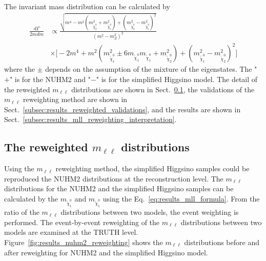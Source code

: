 The invariant mass distribution can be calculated by
%
\begin{align}
    \frac{d\Gamma}{2mdm}
    & \propto \frac{\sqrt{m^{4}-m^{2}(m^{2}_{\widetilde{\chi}^{0}_{2}} + m^{2}_{\widetilde{\chi}^{0}_{1}})+(m^{2}_{\widetilde{\chi}^{0}_{2}} - m^{2}_{\widetilde{\chi}^{0}_{1}})^{2}}}{(m^{2} - m^{2}_{Z})^{2}}\\
    & \times \Big[-2m^{4}+m^{2}(m^{2}_{\widetilde{\chi}^{0}_{1}} \pm 6 m_{\widetilde{\chi}^{0}_{1}} m_{\widetilde{\chi}^{0}_{1}} + m^{2}_{\widetilde{\chi}^{0}_{2}})+(m^{2}_{\widetilde{\chi}^{0}_{1}} - m^{2}_{\widetilde{\chi}^{0}_{2}})^{2}\Big]
    \label{eq:results_mll_formula}
\end{align}
%
where the $\pm$ depends on the assumption of the mixture of the eigenstates.
The "$+$" is for the NUHM2 and "$-$" is for the simplified Higgsino model.
The detail of the reweighted $m_{\ell \ell}$ distributions are shown in Sect.~\ref{subsec:results_reweighted_mll_distributions}, the validations of the $m_{\ell \ell}$ reweighting method are shown in Sect.~\ref{subsec:results_reweighted_validations}, and the results are shown in Sect.~\ref{subsec:results_mll_reweighting_interpretation}.


\subsection{The reweighted $m_{\ell \ell}$ distributions}
\label{subsec:results_reweighted_mll_distributions}
Using the $m_{\ell \ell}$ reweighting method, the simplified Higgsino samples could be reproduced the NUHM2 distributions at the reconstruction level.
The $m_{\ell \ell}$ distributions for the NUHM2 and the simplified Higgsino samples can be calculated by the $m_{\widetilde{\chi}^{0}_{1}}$ and $m_{\widetilde{\chi}^{0}_{1}}$ using the Eq.~\ref{eq:results_mll_formula}.
From the ratio of the $m_{\ell \ell}$ distributions between two models, the event weighting is performed.
The event-by-event reweighting of the $m_{\ell \ell}$ distributions between two models are examined at the TRUTH level.
Figure~\ref{fig:results_nuhm2_reweighting} shows the $m_{\ell \ell}$ distributions before and after reweighting for NUHM2 and the simplified Higgsino model.


